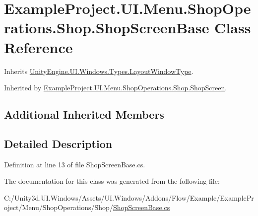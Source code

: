 \hypertarget{class_example_project_1_1_u_i_1_1_menu_1_1_shop_operations_1_1_shop_1_1_shop_screen_base}{}\section{Example\+Project.\+U\+I.\+Menu.\+Shop\+Operations.\+Shop.\+Shop\+Screen\+Base Class Reference}
\label{class_example_project_1_1_u_i_1_1_menu_1_1_shop_operations_1_1_shop_1_1_shop_screen_base}


Inherits \hyperlink{class_unity_engine_1_1_u_i_1_1_windows_1_1_types_1_1_layout_window_type}{Unity\+Engine.\+U\+I.\+Windows.\+Types.\+Layout\+Window\+Type}.



Inherited by \hyperlink{class_example_project_1_1_u_i_1_1_menu_1_1_shop_operations_1_1_shop_1_1_shop_screen}{Example\+Project.\+U\+I.\+Menu.\+Shop\+Operations.\+Shop.\+Shop\+Screen}.

\subsection*{Additional Inherited Members}


\subsection{Detailed Description}


Definition at line 13 of file Shop\+Screen\+Base.\+cs.



The documentation for this class was generated from the following file\+:\begin{DoxyCompactItemize}
\item 
C\+:/\+Unity3d.\+U\+I.\+Windows/\+Assets/\+U\+I.\+Windows/\+Addons/\+Flow/\+Example/\+Example\+Project/\+Menu/\+Shop\+Operations/\+Shop/\hyperlink{_shop_screen_base_8cs}{Shop\+Screen\+Base.\+cs}\end{DoxyCompactItemize}
